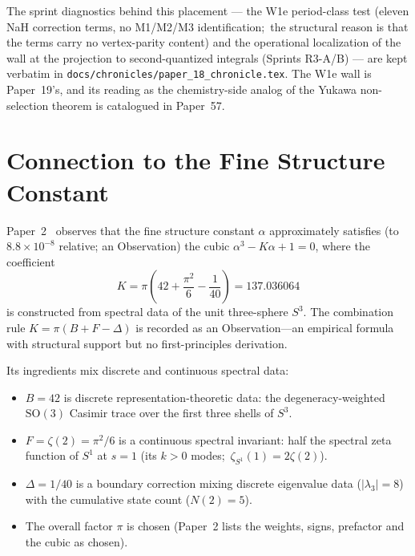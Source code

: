 \documentclass[aps,pra,twocolumn,superscriptaddress,longbibliography]{revtex4-2}
\begin{document}
The sprint diagnostics behind this placement --- the W1e period-class
test (eleven NaH correction terms, no M1/M2/M3 identification;\ the
structural reason is that the terms carry no vertex-parity content) and
the operational localization of the wall at the projection to
second-quantized integrals (Sprints R3-A/B) --- are kept verbatim in
\texttt{docs/chronicles/paper\_18\_chronicle.tex}.  The W1e wall is
Paper~19's, and its reading as the chemistry-side analog of the Yukawa
non-selection theorem is catalogued in Paper~57.


\section{Connection to the Fine Structure Constant}
\label{sec:alpha}

Paper~2~\cite{loutey_paper2} observes that the fine structure
constant $\alpha$ approximately satisfies (to $8.8\times10^{-8}$
relative; an Observation) the cubic $\alpha^3 - K\alpha + 1 = 0$,
where the coefficient
\begin{equation}
  K = \pi\!\left(42 + \frac{\pi^2}{6} - \frac{1}{40}\right)
  = 137.036064
  \label{eq:K}
\end{equation}
is constructed from spectral data of the unit three-sphere
$S^3$.  The combination rule
$K = \pi(B + F - \Delta)$ is recorded as an Observation---an
empirical formula with structural support but no first-principles
derivation.

Its ingredients mix discrete and continuous spectral data:
\begin{itemize}
  \item $B = 42$ is discrete representation-theoretic data:
    the degeneracy-weighted $\mathrm{SO}(3)$ Casimir trace over
    the first three shells of $S^3$.
  \item $F = \zeta(2) = \pi^2/6$ is a continuous spectral
    invariant: half the spectral zeta function of $S^1$ at $s = 1$
    (its $k > 0$ modes;\ $\zeta_{S^1}(1) = 2\zeta(2)$).
  \item $\Delta = 1/40$ is a boundary correction mixing discrete
    eigenvalue data ($|\lambda_3| = 8$) with the cumulative state
    count ($N(2) = 5$).
  \item The overall factor $\pi$ is chosen (Paper~2 lists the
    weights, signs, prefactor and the cubic as chosen).
\end{itemize}
\end{document}
